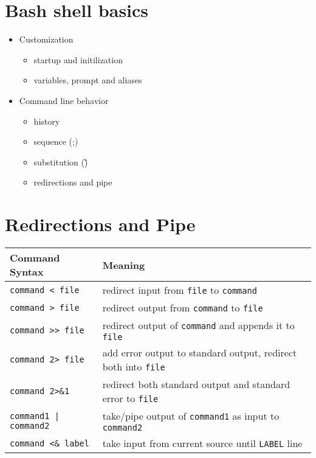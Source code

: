 \documentclass{report}
\begin{document}
\section{Bash shell basics}
\begin{itemize}
  \item Customization
\begin{itemize}[label=$\circ$]
  \item startup and initilization
  \item variables, prompt and aliases
\end{itemize}
\item Command line behavior
  \begin{itemize}[label=$\circ$]
    \item history
    \item sequence  (;)
    \item substitution (\`\`)
    \item redirections and pipe
  \end{itemize}
\end{itemize}
\newpage
\section{Redirections and Pipe}
\begin{table}[h]
\centering
\begin{tabular}{@{}ll@{}}
\toprule
Command Syntax       & Meaning                                                   \\ \midrule
\texttt{command < file}         & redirect input from \texttt{file} to \texttt{command}                 \\
\texttt{command > file}         & redirect output from \texttt{command} to \texttt{file}                \\
\texttt{command >> file}        & redirect output of \texttt{command} and appends it to \texttt{file}   \\
\texttt{command 2> file}        & add error output to standard output, redirect both into \texttt{file} \\
\texttt{command 2>\&1}          & redirect both standard output and standard error to \texttt{file}     \\
\texttt{command1 | command2}    & take/pipe output of \texttt{command1} as input to \texttt{command2}   \\
\texttt{command <\& label}      & take input from current source until \texttt{LABEL} line              \\ \bottomrule
\end{tabular}
\end{table}
\end{document}
